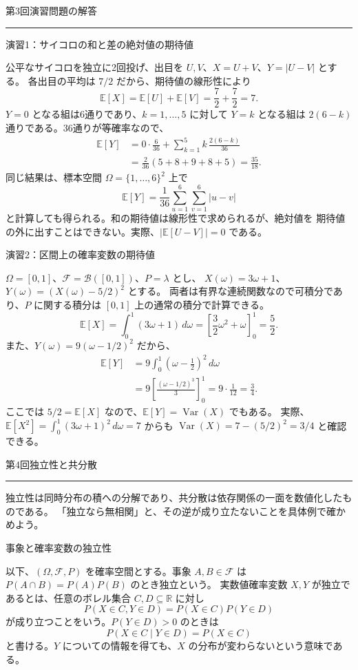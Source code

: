 \documentclass[a4paper,10pt,pdflatex,ja=standard,jafont=ipaex-type1,
  magstyle=real,scale=1]{bxjsarticle}
\newcommand{\coursename}{確率論と統計学 I}
\newcommand{\topic}[1]{\par\vspace{5pt}
  {\large\sffamily\mdseries\color{accent}#1}\par\vspace{2pt}}
\newcommand{\handouttitle}[1]{%
  \begin{center}
    {\Large\color{ink}#1}\par\vspace{3mm}
    {\color{accent}\rule{0.88\linewidth}{0.7pt}}
  \end{center}\vspace{-2mm}}
\newcommand{\keybox}[1]{\par\vspace{3pt}\begingroup
  \setlength{\fboxsep}{5pt}
  \colorbox{soft}{\parbox{\dimexpr\linewidth-2\fboxsep\relax}{#1}}%
  \endgroup\par\vspace{2pt}}
\newcommand{\F}{\mathcal F}
\newcommand{\R}{\mathbb R}
\newcommand{\E}{\mathbb E}
\newcommand{\Var}{\operatorname{Var}}
\begin{document}
\fontsize{10pt}{13.5pt}\selectfont
\begingroup
\fancyhead[L]{\small\color{ink}\coursename{}・前回の演習解答}
\handouttitle{第3回\quad 演習問題の解答}

\topic{演習1：サイコロの和と差の絶対値の期待値}
公平なサイコロを独立に2回投げ、出目を $U,V$、$X=U+V$、$Y=|U-V|$ とする。
各出目の平均は $7/2$ だから、期待値の線形性により
$$
  \E[X]=\E[U]+\E[V]=\frac72+\frac72=7.
$$
$Y=0$ となる組は6通りであり、$k=1,\ldots,5$ に対して
$Y=k$ となる組は $2(6-k)$ 通りである。36通りが等確率なので、
$$
  \begin{aligned}
    \E[Y]&=0\cdot\frac6{36}
      +\sum_{k=1}^5 k\,\frac{2(6-k)}{36}\\
      &=\frac{2}{36}(5+8+9+8+5)=\frac{35}{18}.
  \end{aligned}
$$
同じ結果は、標本空間 $\Omega=\{1,\ldots,6\}^2$ 上で
$$
  \E[Y]=\frac1{36}\sum_{u=1}^6\sum_{v=1}^6|u-v|
$$
と計算しても得られる。和の期待値は線形性で求められるが、絶対値を
期待値の外に出すことはできない。実際、$|\E[U-V]|=0$ である。

\topic{演習2：区間上の確率変数の期待値}
$\Omega=[0,1]$、$\F=\mathcal B([0,1])$、$P=\lambda$ とし、
$X(\omega)=3\omega+1$、$Y(\omega)=(X(\omega)-5/2)^2$ とする。
両者は有界な連続関数なので可積分であり、$P$ に関する積分は
$[0,1]$ 上の通常の積分で計算できる。
$$
  \E[X]=\int_0^1(3\omega+1)\,d\omega
    =\left[\frac32\omega^2+\omega\right]_0^1=\frac52.
$$
また、$Y(\omega)=9(\omega-1/2)^2$ だから、
$$
  \begin{aligned}
    \E[Y]&=9\int_0^1\left(\omega-\frac12\right)^2\,d\omega\\
      &=9\left[\frac{(\omega-1/2)^3}{3}\right]_0^1
       =9\cdot\frac1{12}=\frac34.
  \end{aligned}
$$
ここでは $5/2=\E[X]$ なので、$\E[Y]=\Var(X)$ でもある。
実際、$\E[X^2]=\int_0^1(3\omega+1)^2\,d\omega=7$ からも
$\Var(X)=7-(5/2)^2=3/4$ と確認できる。
\clearpage
\endgroup

\handouttitle{第4回\quad 独立性と共分散}
\keybox{独立性は同時分布の積への分解であり、共分散は依存関係の一面を数値化したものである。
「独立なら無相関」と、その逆が成り立たないことを具体例で確かめよう。}

\topic{事象と確率変数の独立性}
以下、$(\Omega,\F,P)$ を確率空間とする。事象 $A,B\in\F$ は
$P(A\cap B)=P(A)P(B)$ のとき独立という。
実数値確率変数 $X,Y$ が独立であるとは、任意のボレル集合 $C,D\subseteq\R$ に対し
$$P(X\in C,Y\in D)=P(X\in C)P(Y\in D)$$
が成り立つことをいう。$P(Y\in D)>0$ のときは
$$P(X\in C\mid Y\in D)=P(X\in C)$$
と書ける。$Y$ についての情報を得ても、$X$ の分布が変わらないという意味である。
\end{document}
